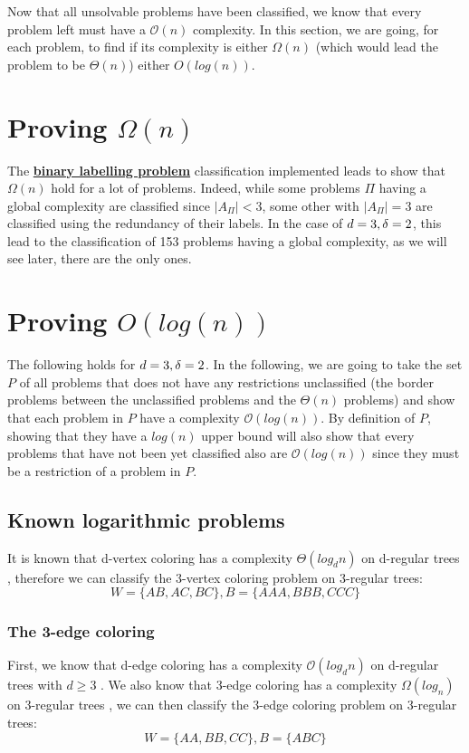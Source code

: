 Now that all unsolvable problems have been classified, we know that every problem left must have a $\mathcal{O}(n)$ complexity. In this section, we are going, for each problem, to find if its complexity is either $\Omega(n)$ (which would lead the problem to be $\Theta(n)$) either $O(log(n))$.
\section[Proving Omega(n)]{Proving $\Omega(n)$}
The \hyperref[sec:BLP]{\textbf{binary labelling problem}} classification implemented leads to show that $\Omega(n)$ hold for a lot of problems. Indeed, while some problems $\Pi$ having a global complexity are classified since $|A_\Pi|<3$, some other with $|A_\Pi| = 3$ are classified using the redundancy of their labels. In the case of $d = 3, \delta = 2$, this lead to the classification of 153 problems having a global complexity, as we will see later, there are the only ones.
\section[Proving O(log(n))]{Proving $O(log(n))$}
The following holds for $d = 3, \delta = 2$.
In the following, we are going to take the set $P$ of all problems that does not have any restrictions unclassified (the border problems between the unclassified problems and the $\Theta(n)$ problems) and show that each problem in $P$ have a complexity $\mathcal{O}(log(n))$. By definition of $P$, showing that they have a $log(n)$ upper bound will also show that every problems that have not been yet classified also are $\mathcal{O}(log(n))$ since they must be a restriction of a problem in $P$.

\subsection{Known logarithmic problems}
It is known that d-vertex coloring has a complexity $\Theta(log_dn)$ on d-regular trees \cite{DBLP:journals/corr/ChangKP16}, therefore we can classify the 3-vertex coloring problem on 3-regular trees: $$W = \{AB, AC, BC\}, B =\{AAA,BBB,CCC\}$$

\subsubsection{The 3-edge coloring}
First, we know that d-edge coloring has a complexity $\mathcal{O}(log_dn)$  on d-regular trees with $d\geq 3$ \cite{DBLP:journals/corr/abs-1708-04290}.
We also know that 3-edge coloring has a complexity $\Omega(log_n)$ on 3-regular trees \cite{balliu2019locality}, we can then classify the 3-edge coloring problem on 3-regular trees: $$W = \{AA, BB, CC\}, B=\{ABC\}$$


